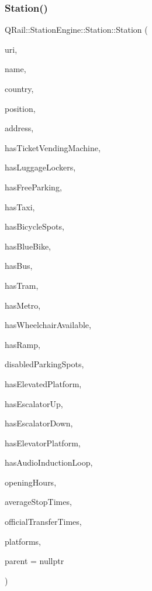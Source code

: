 \subsubsection{\texorpdfstring{Station()}{Station()}\hspace{0.1cm}{\footnotesize\ttfamily [5/5]}}
{\footnotesize\ttfamily Q\+Rail\+::\+Station\+Engine\+::\+Station\+::\+Station (\begin{DoxyParamCaption}\item[{const Q\+Url \&}]{uri,  }\item[{const Q\+Map$<$ Q\+Locale\+::\+Language, Q\+String $>$ \&}]{name,  }\item[{const Q\+Locale\+::\+Country \&}]{country,  }\item[{const Q\+Geo\+Coordinate \&}]{position,  }\item[{const Q\+Geo\+Address \&}]{address,  }\item[{const bool \&}]{has\+Ticket\+Vending\+Machine,  }\item[{const bool \&}]{has\+Luggage\+Lockers,  }\item[{const bool \&}]{has\+Free\+Parking,  }\item[{const bool \&}]{has\+Taxi,  }\item[{const bool \&}]{has\+Bicycle\+Spots,  }\item[{const bool \&}]{has\+Blue\+Bike,  }\item[{const bool \&}]{has\+Bus,  }\item[{const bool \&}]{has\+Tram,  }\item[{const bool \&}]{has\+Metro,  }\item[{const bool \&}]{has\+Wheelchair\+Available,  }\item[{const bool \&}]{has\+Ramp,  }\item[{const qint16 \&}]{disabled\+Parking\+Spots,  }\item[{const bool \&}]{has\+Elevated\+Platform,  }\item[{const bool \&}]{has\+Escalator\+Up,  }\item[{const bool \&}]{has\+Escalator\+Down,  }\item[{const bool \&}]{has\+Elevator\+Platform,  }\item[{const bool \&}]{has\+Audio\+Induction\+Loop,  }\item[{const Q\+Map$<$ \mbox{\hyperlink{classQRail_1_1StationEngine_1_1Station_ae8c109a1d5ce2bb41959e62e32392631}{Station\+Engine\+::\+Station\+::\+Day}}, Q\+Pair$<$ Q\+Time, Q\+Time $>$$>$ \&}]{opening\+Hours,  }\item[{const qreal \&}]{average\+Stop\+Times,  }\item[{const quint32 \&}]{official\+Transfer\+Times,  }\item[{const Q\+Map$<$ Q\+Url, Q\+String $>$ \&}]{platforms,  }\item[{Q\+Object $\ast$}]{parent = {\ttfamily nullptr} }\end{DoxyParamCaption})\hspace{0.3cm}{\ttfamily [explicit]}}



